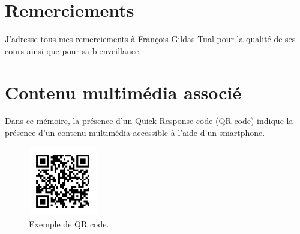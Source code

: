 
\section*{Remerciements}

J'adresse tous mes remerciements à François-Gildas Tual pour la qualité de ses
cours ainsi que pour sa bienveillance.


\section*{Contenu multimédia associé}

Dans ce mémoire, la présence d'un Quick Response code (QR code) indique la
présence d'un contenu multimédia accessible à l'aide d'un smartphone.

\begin{figure}[!ht]
  \begin{bigcenter}
    \includegraphics[width=3cm, keepaspectratio]{qr-cover.pdf}
  \end{bigcenter}
  \caption{Exemple de QR code.}
\end{figure}

